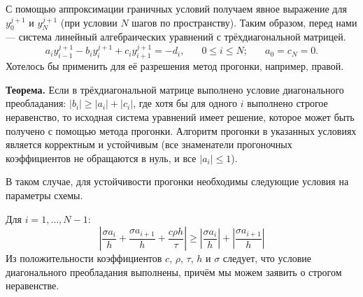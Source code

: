 \documentclass[12pt, a4paper]{article}
\begin{document}
	С помощью аппроксимации граничных условий получаем явное выражение для $y_0^{j+1}$ и $y_N^{j+1}$ (при условии $N$ шагов по пространству). Таким образом, перед нами --- система линейный алгебраических уравнений с трёхдиагональной матрицей.
	\[
	a_i  y_{i-1}^{j+1} - b_i y_i^{j+1} + c_i y_{i+1}^{j+1} = - d_i, \phantom{xxx} 0\le i\le N; \phantom{xxx} a_0=c_N = 0.
	\]
	 Хотелось бы применить для её разрешения метод прогонки, например, правой.
	
	\textbf{Теорема.} Если в трёхдиагональной матрице выполнено условие диагонального преобладания: $|b_i| \ge |a_i| + |c_i|$, где хотя бы для одного $i$ выполнено строгое неравенство, то исходная система уравнений имеет решение, которое может быть получено с помощью метода прогонки. Алгоритм прогонки в указанных условиях является корректным и устойчивым (все знаменатели прогоночных коэффициентов не обращаются в нуль, и все $|a_i| \le1$).
	
	В таком случае, для устойчивости прогонки необходимы следующие условия на параметры схемы.
	
	Для $i=1, \ldots, N-1$:
	\[
	|\dfrac{\sigma a_i}{h} + \dfrac{\sigma a_{i+1}}{h}+\dfrac{c \rho h}{\tau}| \ge |\dfrac{\sigma a_i}{h}| + |\dfrac{\sigma a_{i+1}}{h}|
	\]
	Из положительности коэффициентов $c$, $\rho$, $\tau$, $h$ и $\sigma$ следует, что условие диагонального преобладания выполнены, причём мы можем заявить о строгом неравенстве.
	
\end{document}
